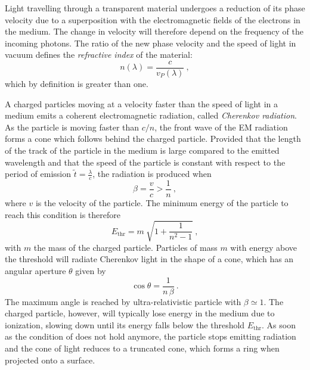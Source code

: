Light travelling through a transparent material undergoes a reduction of its phase velocity %
due to a superposition with the electromagnetic fields of the electrons in the medium. %
The change in velocity will therefore depend on the frequency of the incoming photons.
The ratio of the new phase velocity and the speed of light in vacuum defines the \emph{refractive index} %
of the material:
\begin{equation}
	\label{eq:ref_index}
	n(\lambda) = \frac{c}{v_P(\lambda)}\ ,
\end{equation}
which by definition is greater than one.

A charged particles moving at a velocity faster than the speed of light in a medium %
emits a coherent electromagnetic radiation, called \emph{Cherenkov radiation}. %
As the particle is moving faster than $c / n$, the front wave of the EM radiation forms a cone %
which follows behind the charged particle.
Provided that the length of the track of the particle in the medium is large compared to the emitted wavelength %
and that the speed of the particle is constant with respect to the period of emission $\tilde{t} = \frac{\lambda}{c}$,
the radiation is produced when
\begin{equation}
	\label{eq:cherenkov}
	\beta = \frac{v}{c} > \frac{1}{n}\ ,
\end{equation}
where $v$ is the velocity of the particle.
The minimum energy of the particle to reach this condition is therefore
\begin{equation}
	\label{eq:cherenkov_threshold}
	E_\text{thr} = m\ \sqrt{1 + \frac{1}{n^2-1}}\ ,
\end{equation}
with $m$ the mass of the charged particle.
Particles of mass $m$ with energy above the threshold will radiate Cherenkov light in the shape of a cone, %
which has an angular aperture $\theta$ given by
\begin{equation}
	\label{eq:cherenkov_angle}
	\cos \theta = \frac{1}{n\,\beta} \ .
\end{equation}
The maximum angle is reached by ultra-relativistic particle with $\beta \simeq 1$.
The charged particle, however, will typically lose energy in the medium due to ionization, %
slowing down until its energy falls below the threshold $E_\text{thr}$.
As soon as the condition of  does not hold anymore, %
the particle stops emitting radiation and the cone of light reduces to a truncated cone, %
which forms a ring when projected onto a surface.

